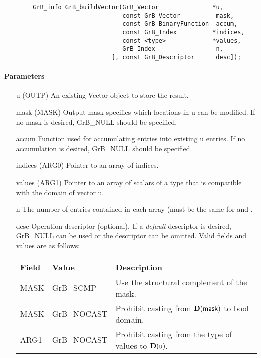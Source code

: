 \begin{verbatim}
        GrB_info GrB_buildVector(GrB_Vector               *u,
                                 const GrB_Vector          mask,
                                 const GrB_BinaryFunction  accum,
                                 const GrB_Index          *indices,
                                 const <type>             *values,
                                 GrB_Index                 n,
                              [, const GrB_Descriptor      desc]);
\end{verbatim}

\paragraph{Parameters}

\begin{itemize}[leftmargin=1.1in]
    	\item[{\sf u}]      ({\sf OUTP}) An existing Vector object to store the result.
    	\item[{\sf mask}]   ({\sf MASK}) Output mask specifies which locations in
                        {\sf u} can be modified.  If no mask is desired,
	                    {\sf GrB\_NULL} should be specified.
	\item[{\sf accum}]  Function used for accumulating entries into existing
                        {\sf u} entries. If no accumulation is desired,
	                    {\sf GrB\_NULL} should be specified.
	\item[{\sf indices}] ({\sf ARG0}) Pointer to an array of indices. 
	\item[{\sf values}] ({\sf ARG1}) Pointer to an array of scalars of a type that
                                     is compatible with the domain of vector {\sf u}.
    	\item[{\sf n}]      The number of entries contained in each array (must be the same for  and .
    	\item[{\sf desc}]   Operation descriptor (optional). If a
	\emph{default} descriptor is desired, {\sf GrB\_NULL} can be
	used or the descriptor can be omitted.  Valid fields and values are as follows: \\
    	\begin{tabular}{lll}
    		Field  & Value & Description \\
    		\hline
    		{\sf MASK} & {\sf GrB\_SCMP}   & Use the structural complement of the mask. \\
    		{\sf MASK} & {\sf GrB\_NOCAST} & Prohibit casting from $\bold{D}({\sf mask})$ to {\sf bool} domain. \\
    		{\sf ARG1} & {\sf GrB\_NOCAST} & Prohibit casting from the type of {\sf values} to $\bold{D}(\arg{u})$. \\
    	\end{tabular}
\end{itemize}

